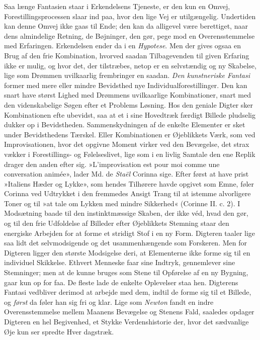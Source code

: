 \documentclass[12pt,a4paper,openany]{book}
\newcommand{\opage}[1]{\marginnote{\footnotesize\textit{[#1]}}}
\begin{document}
Saa længe Fantasien staar i Erkendelsens Tjeneste, er den kun en Omvej,
Forestillingsprocessen slaar ind paa, hvor den lige Vej er utilgængelig.
Undertiden kan denne Omvej ikke gaas til Ende; den kan da alligevel være
berettiget, naar dens almindelige Retning, de Bøjninger, den gør, pege
mod en Overensstemmelse med Erfaringen. Erkendelsen ender da i en
\emph{Hypotese}. Men der gives ogsaa en Brug af den frie Kombination,
hvorved saadan Tilbagevenden til given Erfaring ikke er mulig, og hvor
det, der tilstræbes, netop er en selvstændig og ny Skabelse, lige som
Drømmen uvilkaarlig frembringer en saadan. \emph{Den kunstneriske
Fantasi} former med mere eller mindre Bevidsthed nye
Individualforestillinger. Den kan snart have størst Lighed med Drømmens
uvilkaarlige Kombinationer, snart med den videnskabelige Søgen efter et
Problems Løsning. Hos den geniale Digter sker Kombinationen efte
ubevidst, saa at et i sine Hovedtræk færdigt Billede pludselig dukker op
i Bevidstheden. Sammenskydningen af de enkelte Elementer er sket under
Bevidsthedens Tærskel. Eller Kombinationen er Øjeblikkets Værk, som ved
Improvisationen, hvor det opgivne Moment virker ved den Bevægelse, det
strax vækker i Forestillings- og Følelseslivet, lige som i en livlig
Samtale den ene Replik drager den anden efter sig. »L’improvisation est
pour moi comme une conversation animée», lader Md. de \emph{Staël}
Corinna sige. Efter først at have prist »Italiens Hæder og Lykke», som
hendes Tilhørere havde opgivet som Emne, føler Corinna ved Udtrykket i
den fremmedes Ansigt Trang til at istemme alvorligere Toner og til »at
tale om Lykken med mindre Sikkerhed« (Corinne II. c. 2). I Modsætning
baade til den instinktmæssige Skaben, der ikke véd,
\opage{224}hvad den gør, og til den frie Udfoldelse af Billeder efter
Øjeblikkets Stemning staar den energiske Arbejden for at forme et
stridigt Stof i en ny Form. Digteren taaler lige saa lidt det
selvmodsigende og det usammenhængende som Forskeren. Men for Digteren
ligger den største Modsigelse deri, at Elementerne ikke forme sig til en
individuel Skikkelse. Ethvert Menneske faar sine Indtryk, gennemlever
sine Stemninger; men at de kunne bruges som Stene til Opførelse af en ny
Bygning, gaar kun op for faa. De fleste lade de enkelte Oplevelser staa
hen. Digterens Fantasi vedbliver derimod at arbejde med dem, indtil de
forme sig til et Billede, og \emph{først} da føler han sig fri og klar.
Lige som \emph{Newton} fandt en indre Overensstemmelse mellem Maanens
Bevægelse og Stenens Fald, saaledes opdager Digteren en hel Begivenhed,
et Stykke Verdenshistorie der, hvor det sædvanlige Øje kun ser spredte
Hver dagstræk.
\end{document}
